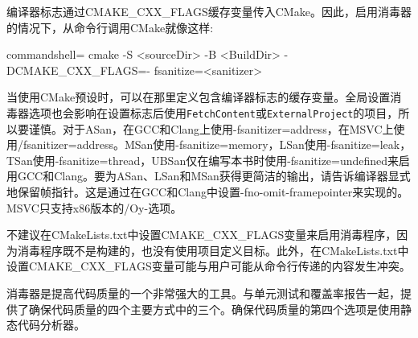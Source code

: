 编译器标志通过CMAKE\_CXX\_FLAGS缓存变量传入CMake。因此，启用消毒器的情况下，从命令行调用CMake就像这样:

\begin{tcblisting}{commandshell={}}
cmake -S <sourceDir> -B <BuildDir> -DCMAKE_CXX_FLAGS=-
  fsanitize=<sanitizer>
\end{tcblisting}

当使用CMake预设时，可以在那里定义包含编译器标志的缓存变量。全局设置消毒器选项也会影响在设置标志后使用\texttt{FetchContent}或\texttt{ExternalProject}的项目，所以要谨慎。对于ASan，在GCC和Clang上使用-fsanitizer=address，在MSVC上使用/fsanitizer=address。MSan使用-fsanitize=memory，LSan使用-fsanitize=leak，TSan使用-fsanitize=thread，UBSan仅在编写本书时使用-fsanitize=undefined来启用GCC和Clang。要为ASan、LSan和MSan获得更简洁的输出，请告诉编译器显式地保留帧指针。这是通过在GCC和Clang中设置-fno-omit-framepointer来实现的。MSVC只支持x86版本的/Oy-选项。

\begin{tcolorbox}[colback=webgreen!5!white,colframe=webgreen!75!black,title=Note]
不建议在CMakeLists.txt中设置CMAKE\_CXX\_FLAGS变量来启用消毒程序，因为消毒程序既不是构建的，也没有使用项目定义目标。此外，在CMakeLists.txt中设置CMAKE\_CXX\_FLAGS变量可能与用户可能从命令行传递的内容发生冲突。
\end{tcolorbox}

消毒器是提高代码质量的一个非常强大的工具。与单元测试和覆盖率报告一起，提供了确保代码质量的四个主要方式中的三个。确保代码质量的第四个选项是使用静态代码分析器。

































